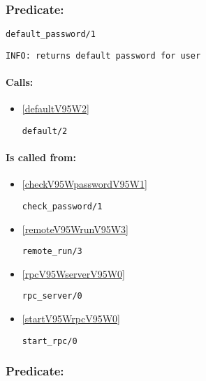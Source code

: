 \subsubsection{Predicate:} \label{defaultV95WpasswordV95W1}

\begin{verbatim}
default_password/1
\end{verbatim}

{\small \begin{verbatim}
INFO: returns default password for user

\end{verbatim}}
\paragraph{Calls:} 
\begin{itemize}
\item \ref{defaultV95W2} 
\begin{verbatim}
default/2
\end{verbatim}

\end{itemize}
\paragraph{Is called from:} 
\begin{itemize}
\item \ref{checkV95WpasswordV95W1} 
\begin{verbatim}
check_password/1
\end{verbatim}

\item \ref{remoteV95WrunV95W3} 
\begin{verbatim}
remote_run/3
\end{verbatim}

\item \ref{rpcV95WserverV95W0} 
\begin{verbatim}
rpc_server/0
\end{verbatim}

\item \ref{startV95WrpcV95W0} 
\begin{verbatim}
start_rpc/0
\end{verbatim}

\end{itemize}

\subsubsection{Predicate:} \label{defaultV95WportV95W1}

